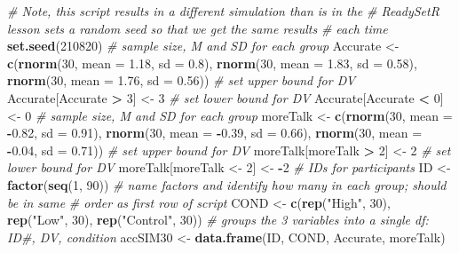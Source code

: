 \documentclass[
  11pt,
]{book}
\newenvironment{Shaded}{\begin{snugshade}}{\end{snugshade}}
\newcommand{\AttributeTok}[1]{\textcolor[rgb]{0.27,0.27,0.27}{#1}}
\newcommand{\CommentTok}[1]{\textcolor[rgb]{0.37,0.37,0.37}{\textit{#1}}}
\newcommand{\DecValTok}[1]{\textcolor[rgb]{0.06,0.06,0.06}{#1}}
\newcommand{\FloatTok}[1]{\textcolor[rgb]{0.06,0.06,0.06}{#1}}
\newcommand{\FunctionTok}[1]{\textcolor[rgb]{0.27,0.27,0.27}{\textbf{#1}}}
\newcommand{\NormalTok}[1]{#1}
\newcommand{\OtherTok}[1]{\textcolor[rgb]{0.37,0.37,0.37}{#1}}
\newcommand{\SpecialCharTok}[1]{\textcolor[rgb]{0.43,0.43,0.43}{\textbf{#1}}}
\newcommand{\StringTok}[1]{\textcolor[rgb]{0.5,0.5,0.5}{#1}}
\begin{document}
\begin{Shaded}
\begin{Highlighting}[]
\CommentTok{\# Note, this script results in a different simulation than is in the}
\CommentTok{\# ReadySetR lesson sets a random seed so that we get the same results}
\CommentTok{\# each time}
\FunctionTok{set.seed}\NormalTok{(}\DecValTok{210820}\NormalTok{)}
\CommentTok{\# sample size, M and SD for each group}
\NormalTok{Accurate }\OtherTok{\textless{}{-}} \FunctionTok{c}\NormalTok{(}\FunctionTok{rnorm}\NormalTok{(}\DecValTok{30}\NormalTok{, }\AttributeTok{mean =} \FloatTok{1.18}\NormalTok{, }\AttributeTok{sd =} \FloatTok{0.8}\NormalTok{), }\FunctionTok{rnorm}\NormalTok{(}\DecValTok{30}\NormalTok{, }\AttributeTok{mean =} \FloatTok{1.83}\NormalTok{,}
    \AttributeTok{sd =} \FloatTok{0.58}\NormalTok{), }\FunctionTok{rnorm}\NormalTok{(}\DecValTok{30}\NormalTok{, }\AttributeTok{mean =} \FloatTok{1.76}\NormalTok{, }\AttributeTok{sd =} \FloatTok{0.56}\NormalTok{))}
\CommentTok{\# set upper bound for DV}
\NormalTok{Accurate[Accurate }\SpecialCharTok{\textgreater{}} \DecValTok{3}\NormalTok{] }\OtherTok{\textless{}{-}} \DecValTok{3}
\CommentTok{\# set lower bound for DV}
\NormalTok{Accurate[Accurate }\SpecialCharTok{\textless{}} \DecValTok{0}\NormalTok{] }\OtherTok{\textless{}{-}} \DecValTok{0}
\CommentTok{\# sample size, M and SD for each group}
\NormalTok{moreTalk }\OtherTok{\textless{}{-}} \FunctionTok{c}\NormalTok{(}\FunctionTok{rnorm}\NormalTok{(}\DecValTok{30}\NormalTok{, }\AttributeTok{mean =} \SpecialCharTok{{-}}\FloatTok{0.82}\NormalTok{, }\AttributeTok{sd =} \FloatTok{0.91}\NormalTok{), }\FunctionTok{rnorm}\NormalTok{(}\DecValTok{30}\NormalTok{, }\AttributeTok{mean =} \SpecialCharTok{{-}}\FloatTok{0.39}\NormalTok{,}
    \AttributeTok{sd =} \FloatTok{0.66}\NormalTok{), }\FunctionTok{rnorm}\NormalTok{(}\DecValTok{30}\NormalTok{, }\AttributeTok{mean =} \SpecialCharTok{{-}}\FloatTok{0.04}\NormalTok{, }\AttributeTok{sd =} \FloatTok{0.71}\NormalTok{))}
\CommentTok{\# set upper bound for DV}
\NormalTok{moreTalk[moreTalk }\SpecialCharTok{\textgreater{}} \DecValTok{2}\NormalTok{] }\OtherTok{\textless{}{-}} \DecValTok{2}
\CommentTok{\# set lower bound for DV}
\NormalTok{moreTalk[moreTalk }\OtherTok{\textless{}{-}} \DecValTok{2}\NormalTok{] }\OtherTok{\textless{}{-}} \SpecialCharTok{{-}}\DecValTok{2}
\CommentTok{\# IDs for participants}
\NormalTok{ID }\OtherTok{\textless{}{-}} \FunctionTok{factor}\NormalTok{(}\FunctionTok{seq}\NormalTok{(}\DecValTok{1}\NormalTok{, }\DecValTok{90}\NormalTok{))}
\CommentTok{\# name factors and identify how many in each group; should be in same}
\CommentTok{\# order as first row of script}
\NormalTok{COND }\OtherTok{\textless{}{-}} \FunctionTok{c}\NormalTok{(}\FunctionTok{rep}\NormalTok{(}\StringTok{"High"}\NormalTok{, }\DecValTok{30}\NormalTok{), }\FunctionTok{rep}\NormalTok{(}\StringTok{"Low"}\NormalTok{, }\DecValTok{30}\NormalTok{), }\FunctionTok{rep}\NormalTok{(}\StringTok{"Control"}\NormalTok{, }\DecValTok{30}\NormalTok{))}
\CommentTok{\# groups the 3 variables into a single df: ID\#, DV, condition}
\NormalTok{accSIM30 }\OtherTok{\textless{}{-}} \FunctionTok{data.frame}\NormalTok{(ID, COND, Accurate, moreTalk)}
\end{Highlighting}
\end{Shaded}
\end{document}
